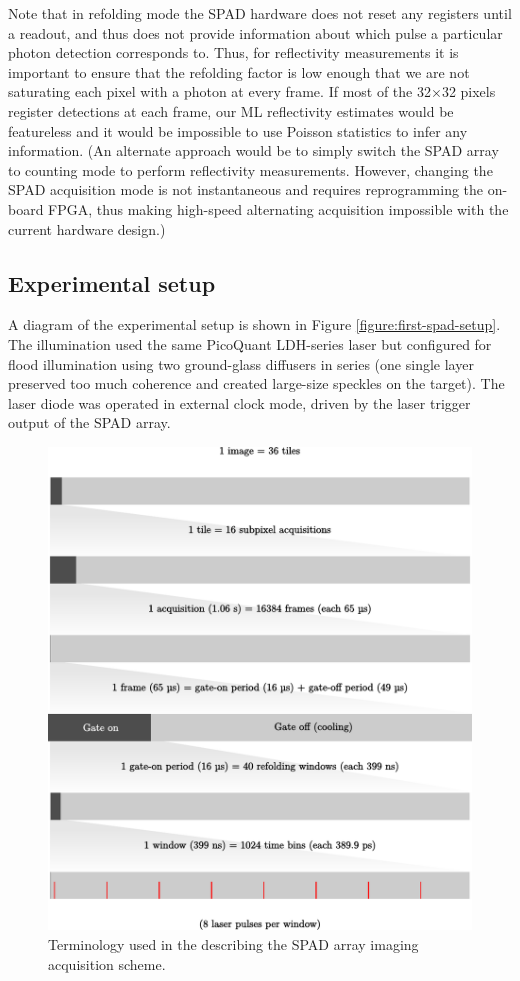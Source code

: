 Note that in refolding mode the SPAD hardware does not reset any registers until a readout, and thus does not provide information about which pulse a particular photon detection corresponds to. Thus, for reflectivity measurements it is important to ensure that the refolding factor is low enough that we are not saturating each pixel with a photon at every frame. If most of the 32$\times$32 pixels register detections at each frame, our ML reflectivity estimates would be featureless and it would be impossible to use Poisson statistics to infer any information. (An alternate approach would be to simply switch the SPAD array to counting mode to perform reflectivity measurements. However, changing the SPAD acquisition mode is not instantaneous and requires reprogramming the on-board FPGA, thus making high-speed alternating acquisition impossible with the current hardware design.)

\subsection{Experimental setup}
A diagram of the experimental setup is shown in Figure \ref{figure:first-spad-setup}. The illumination used the same PicoQuant LDH-series laser but configured for flood illumination using two ground-glass diffusers in series (one single layer preserved too much coherence and created large-size speckles on the target). The laser diode was operated in external clock mode, driven by the laser trigger output of the SPAD array.
 
\begin{figure}[h!]
\centerline{\includegraphics[width=15cm]{figure-first-spad-terms.pdf}}
\caption{Terminology used in the describing the SPAD array imaging acquisition scheme.}
\label{figure:first-spad-terms}
\end{figure}

